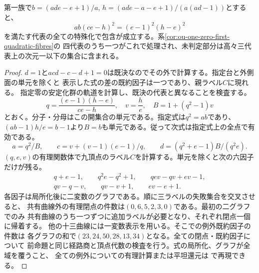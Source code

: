 \begin{proposition}[一零第一族で平方比を持つ代表]
\label{prop:ou-one-zero-first-squared-ratio}
第一族で$b=(ade-e+1)/a$, $h=(ade-a-e+1)/(a(ad-1))$とすると、
\[
              ab(ce-h)^2=(e-1)^2(h-e)^2
\]
を満たす代表の全ての特殊化で包含が成立する。系\ref{cor:ou-one-zero-first-quadratic-fibres}の
四代表のうち一つがこれで処理され、未判定部分は高々三代表上の次元一以下の集合に含まれる。
\end{proposition}
\begin{proof}
$d=1$と$acd-c-d+1=0$は既決なのでその外で計算する。指定台と外側面の単元を除くと
表示した式の差の既約因子は一つであり、親ラベル$C$に現れる。
指定零の安定化群の軌道を計算し、既決の代表と異なることを検査する。
\[
  q=\frac{(e-1)(h-e)}{ce-h},\quad v=\frac he,\quad B=1+(q^2-1)v
\]
とおく。分子・分母はこの開集合の単元である。指定式は$q^2=ab$であり、
$(ab-1)h/e=b-1$より$B=b$も単元である。従って次式は指定式上の全点で有効である。
\[
  a=q^2/B,\qquad c=v+(v-1)(e-1)/q,\qquad
  d=(q^2+e-1)B/(q^2e).
\]
$(q,e,v)$の有理関数体で九頂点のラベル$C$を計算する。単元を除くと次の六因子だけが残る。
\[
\begin{gathered}
q+e-1,\qquad q^2e-q^2+1,\qquad qev-qv+ev-1,\\
qv-q-v,\qquad qv-v+1,\qquad ev-e+1 .
\end{gathered}
\]
各因子は局所化後に二変数のグラフである。順に三ラベルの失敗集合を交叉させると、
共有曲線外の有理閉点の件数は$(0,6,5,2,3,0)$である。最初の二グラフでのみ
共有曲線のうち一つずつに追加ラベルが必要となり、それぞれ閉点一個に帰着する。
他の十三曲線には一変数表示を用いる。そこでの例外既約因子の件数は
各グラフの和で$(23,24,50,28,13,34)$となる。全ての閉点・既約因子について
前命題と同じ経路商と頂点代数の検査を行う。式の局所化、グラフが全域を覆うこと、
全ての例外についての有理計算または平坦還元は
で再現できる。
\end{proof}

